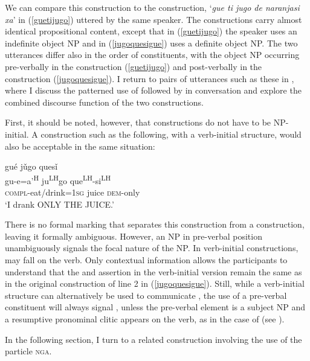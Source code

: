 \newpage %
We can compare this construction to the  construction, `\textit{gue ti jugo de naranjasi xa}' in (\ref{guetijugo}) uttered by the same speaker. The constructions carry almost identical propositional content, except that in (\ref{guetijugo}) the speaker uses an indefinite object NP and in (\ref{jugoquesigue}) uses a definite object NP. The two utterances differ also in the order of constituents, with the object NP occurring pre-verbally in the  construction (\ref{guetijugo}) and post-verbally in the  construction (\ref{jugoquesigue}). I return to pairs of utterances such as these in , where I discuss the patterned use of  followed by  in conversation and explore the combined discourse function of the two constructions. 

First, it should be noted, however, that  constructions do not have to be NP-initial. A construction such as the following, with a verb-initial structure, would also be acceptable in the same situation:

\ea
\glll gu\'{e} j\v{u}go ques\v{i}  \\
gu-e=a'\textsuperscript{H} ju\textsuperscript{LH}go que\textsuperscript{LH}-si\textsuperscript{LH}  \\
\textsc{compl}-eat/drink=\textsc{1sg} juice \textsc{dem}-only  \\
\glt `I drank ONLY THE JUICE.'  

\z
There is no formal marking that separates this construction from a  construction, leaving it formally ambiguous. However, an NP in pre-verbal position unambiguously signals the focal nature of the NP. In verb-initial constructions,  may fall on the verb. Only contextual information allows the participants to understand that the  and assertion in the verb-initial version remain the same as in the original construction of line 2 in (\ref{jugoquesigue}). Still, while a verb-initial structure can alternatively be used to communicate , the use of a pre-verbal constituent will always signal , unless the pre-verbal element is a subject NP and a resumptive pronominal clitic appears on the verb, as in the case of  (see ). 

In the following section, I turn to a related  construction involving the use of the particle \textsc{nga}.

